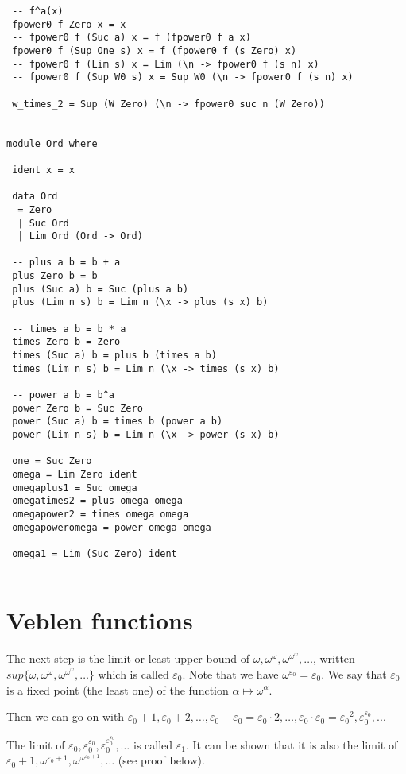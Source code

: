 \documentclass[10pt]{article}
\begin{document}
\begin{verbatim}
 -- f^a(x)
 fpower0 f Zero x = x
 -- fpower0 f (Suc a) x = f (fpower0 f a x)
 fpower0 f (Sup One s) x = f (fpower0 f (s Zero) x)
 -- fpower0 f (Lim s) x = Lim (\n -> fpower0 f (s n) x)
 -- fpower0 f (Sup W0 s) x = Sup W0 (\n -> fpower0 f (s n) x) 

 w_times_2 = Sup (W Zero) (\n -> fpower0 suc n (W Zero))


module Ord where

 ident x = x

 data Ord
  = Zero
  | Suc Ord
  | Lim Ord (Ord -> Ord)

 -- plus a b = b + a
 plus Zero b = b
 plus (Suc a) b = Suc (plus a b)
 plus (Lim n s) b = Lim n (\x -> plus (s x) b)

 -- times a b = b * a
 times Zero b = Zero
 times (Suc a) b = plus b (times a b)
 times (Lim n s) b = Lim n (\x -> times (s x) b)

 -- power a b = b^a
 power Zero b = Suc Zero
 power (Suc a) b = times b (power a b)
 power (Lim n s) b = Lim n (\x -> power (s x) b)

 one = Suc Zero
 omega = Lim Zero ident
 omegaplus1 = Suc omega
 omegatimes2 = plus omega omega
 omegapower2 = times omega omega
 omegapoweromega = power omega omega

 omega1 = Lim (Suc Zero) ident


\end{verbatim}

\section{Veblen functions}

The next step is the limit or least upper bound of \( \omega, \omega^\omega, \omega^{\omega^\omega}, \ldots \), written \( sup \lbrace \omega, \omega^\omega, \omega^{\omega^\omega}, \ldots \rbrace \) which is called \( \varepsilon_0 \). Note that we have \( \omega^{\varepsilon_0} = \varepsilon_0 \). We say that \( \varepsilon_0 \) is a fixed point (the least one) of the function \( \alpha \mapsto \omega^\alpha \).

Then we can go on with \( \varepsilon_0+1, \varepsilon_0+2, \ldots, \varepsilon_0+\varepsilon_0 = \varepsilon_0 \cdot 2, \ldots, \varepsilon_0 \cdot \varepsilon_0 = {\varepsilon_0}^2, \varepsilon_0^{\varepsilon_0}, ...\)

The limit of \( \varepsilon_0, \varepsilon_0^{\varepsilon_0}, \varepsilon_0^{\varepsilon_0^{\varepsilon_0}}, \ldots \) is called \( \varepsilon_1 \). It can be shown that it is also the limit of \( \varepsilon_0+1, \omega^{\varepsilon_0+1}, \omega^{\omega^{\varepsilon_0+1}}, \ldots \) (see proof below).
\end{document}
